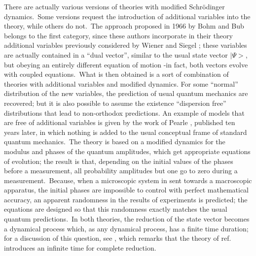 \documentclass[12pt,onecolumn]{article}%
\begin{document}
There are actually various versions of theories with modified Schr\"{o}dinger
dynamics.\ Some versions request the introduction of additional variables into
the theory, while others do not.\ The approach proposed in 1966 by Bohm and
Bub \cite{Bohm-Bub-1} belongs to the first category, since these authors
incorporate in their theory additional variables previously considered by
Wiener and Siegel \cite{Wiener-Siegel}; these variables are actually contained
in a ``dual vector'', similar to the usual state vector $\mid\Psi>$, but
obeying an entirely different equation of motion -in fact, both vectors evolve
with coupled equations.\ What is then obtained is a sort of combination of
theories with additional variables and modified dynamics. For some ``normal''
distribution of the new variables, the prediction of usual quantum mechanics
are recovered; but it is also possible to assume the existence ``dispersion
free'' distributions that lead to non-orthodox predictions. An example of
models that are free of additional variables is given by the work of Pearle
\cite{Pearle}, published ten years later, in which nothing is added to the
usual conceptual frame of standard quantum mechanics.\ The theory is based on
a modified dynamics for the modulus and phases of the quantum amplitudes,
which get appropriate equations of evolution; the result is that, depending on
the initial values of the phases before a measurement, all probability
amplitudes but one go to zero during a measurement.\ Because, when a
microscopic system in sent towards a macroscopic apparatus, the initial phases
are impossible to control with perfect mathematical accuracy, an apparent
randomness in the results of experiments is predicted; the equations are
designed so that this randomness exactly matches the usual quantum
predictions.\ In both theories, the reduction of the state vector becomes a
dynamical process which, as any dynamical process, has a finite time duration;
for a discussion of this question, see \cite{Pearle-4}, which remarks that the
theory of ref. \cite{Bohm-Bub-1} introduces an infinite time for complete reduction.
\end{document}
